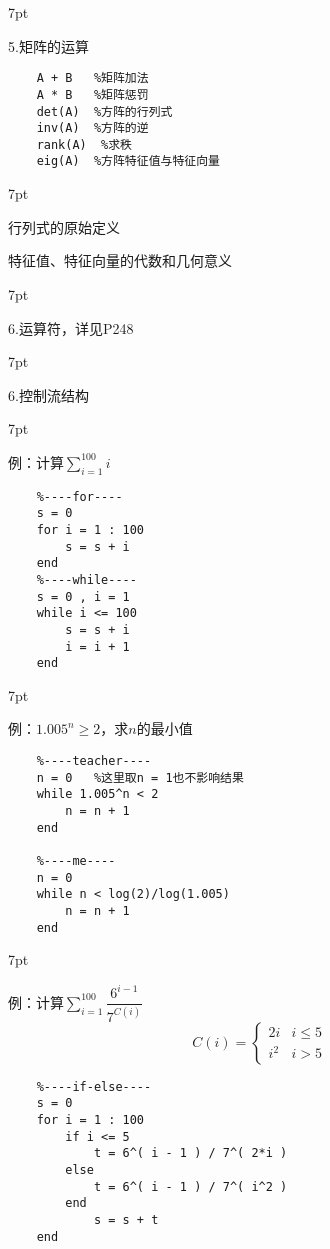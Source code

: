 \documentclass{article} %
\newenvironment{eg}{%
\def\FrameCommand{%
\hspace{1pt}%
{\color{Gray}\vrule width 2pt}%
{\color{egshade}\vrule width 4pt}%
\colorbox{egshade}%
}%
\MakeFramed{\advance\hsize-\width\FrameRestore}%
\noindent\hspace{-4.55pt}%
\begin{adjustwidth}{}{7pt}%
\vspace{2pt}\vspace{2pt}%
\normalfont %
}
{%
\vspace{2pt}\end{adjustwidth}\endMakeFramed%
}
\newenvironment{wa}{%
\def\FrameCommand{%
\hspace{1pt}%
{\color{LightCoral}\vrule width 2pt}%
{\color{washade}\vrule width 4pt}%
\colorbox{washade}%
}%
\MakeFramed{\advance\hsize-\width\FrameRestore}%
\noindent\hspace{-4.55pt}%
\begin{adjustwidth}{}{7pt}%
\vspace{2pt}\vspace{2pt}%
\normalfont %
}
{%
\vspace{2pt}\end{adjustwidth}\endMakeFramed%
}
\begin{document}
\begin{eg}
    5.矩阵的运算
\end{eg}
\begin{lstlisting}
    A + B   %矩阵加法
    A * B   %矩阵惩罚
    det(A)  %方阵的行列式
    inv(A)  %方阵的逆
    rank(A)  %求秩
    eig(A)  %方阵特征值与特征向量
\end{lstlisting}

\begin{wa}
    行列式的原始定义

    \noindent 特征值、特征向量的代数和几何意义
\end{wa}

\begin{eg}
    6.运算符，详见P248
\end{eg}

\begin{eg}
    6.控制流结构
\end{eg}

\begin{wa}
    例：计算$\sum \limits _{i=1}^{100} i$ 
\end{wa}
\begin{lstlisting}
    %----for----
    s = 0
    for i = 1 : 100
        s = s + i
    end
    %----while----
    s = 0 , i = 1
    while i <= 100
        s = s + i
        i = i + 1
    end
\end{lstlisting}

\begin{wa}
    例：$1.005^{n} \geqslant 2$，求$n$的最小值
\end{wa}
\begin{lstlisting}
    %----teacher----
    n = 0   %这里取n = 1也不影响结果
    while 1.005^n < 2 
        n = n + 1
    end

    %----me----
    n = 0
    while n < log(2)/log(1.005)
        n = n + 1
    end
\end{lstlisting}

\begin{wa}
    例：计算$\sum \limits _{i=1}^{100} \dfrac{6^{i - 1}}{7^{C(i)}}$
    $$C(i) =
    \begin{cases}
        2i & i \leqslant 5 \\
        i^{2} & i > 5
    \end{cases}
    $$
\end{wa}
\begin{lstlisting}
    %----if-else----
    s = 0 
    for i = 1 : 100
        if i <= 5
            t = 6^( i - 1 ) / 7^( 2*i ) 
        else
            t = 6^( i - 1 ) / 7^( i^2 ) 
        end
            s = s + t 
    end
\end{lstlisting}
\end{document}
